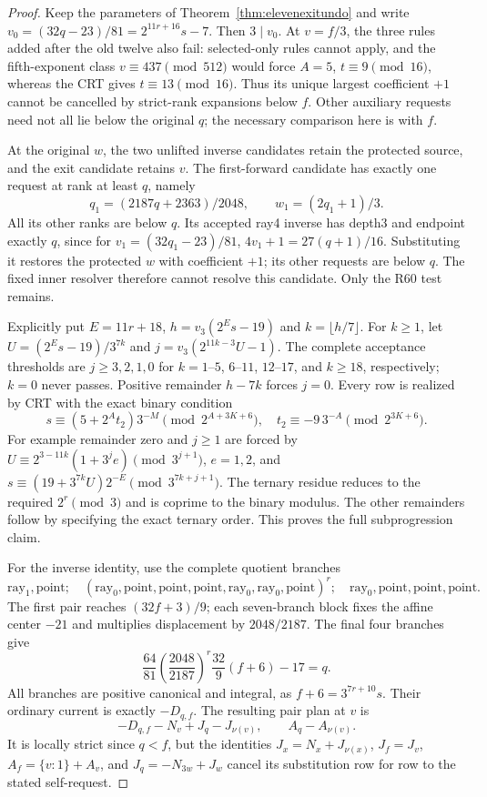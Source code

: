 \documentclass[11pt]{article}
\begin{document}
\begin{proof}
Keep the parameters of Theorem~\ref{thm:elevenexitundo} and write
$v_0=(32q-23)/81=2^{11r+16}s-7$. Then $3\mid v_0$.
At $v=f/3$, the three rules added after the old twelve also fail:
selected-only rules cannot apply, and the fifth-exponent class
$v\equiv437\pmod{512}$ would force $A=5$, $t\equiv9\pmod{16}$,
whereas the CRT gives $t\equiv13\pmod{16}$. Thus its unique largest
coefficient $+1$ cannot be cancelled by strict-rank expansions below $f$.
Other auxiliary requests need not all lie below the original $q$;
the necessary comparison here is with $f$.

At the original $w$, the two unlifted inverse candidates retain the
protected source, and the exit candidate retains $v$. The first-forward
candidate has exactly one request at rank at least $q$, namely
\[
 q_1=(2187q+2363)/2048,\qquad w_1=(2q_1+1)/3.
\]
All its other ranks are below $q$. Its accepted ray4 inverse has
depth3 and endpoint exactly $q$, since for $v_1=(32q_1-23)/81$,
$4v_1+1=27(q+1)/16$. Substituting it restores the protected
$w$ with coefficient $+1$; its other requests are below $q$.
The fixed inner resolver therefore cannot resolve this candidate.
Only the R60 test remains.

Explicitly put $E=11r+18$, $h=v_3(2^Es-19)$ and $k=\lfloor h/7\rfloor$.
For $k\ge1$, let $U=(2^Es-19)/3^{7k}$ and
$j=v_3(2^{11k-3}U-1)$. The complete acceptance thresholds are
$j\ge3,2,1,0$ for $k=1$--$5$, $6$--$11$, $12$--$17$, and
$k\ge18$, respectively; $k=0$ never passes. Positive remainder
$h-7k$ forces $j=0$. Every row is realized by CRT with the exact
binary condition
\[
 s\equiv(5+2^At_2)3^{-M}\pmod{2^{A+3K+6}},\quad
 t_2\equiv-9\,3^{-A}\pmod{2^{3K+6}}.
\]
For example remainder zero and $j\ge1$ are forced by
$U\equiv2^{3-11k}(1+3^je)\pmod{3^{j+1}}$, $e=1,2$,
and $s\equiv(19+3^{7k}U)2^{-E}\pmod{3^{7k+j+1}}$.
The ternary residue reduces to the required $2^r\pmod3$ and is
coprime to the binary modulus. The other remainders follow by specifying
the exact ternary order. This proves the full subprogression claim.

For the inverse identity, use the complete quotient branches
\[
 \mathrm{ray}_1,\mathrm{point};\quad
 (\mathrm{ray}_0,\mathrm{point},\mathrm{point},\mathrm{point},
   \mathrm{ray}_0,\mathrm{ray}_0,\mathrm{point})^r;\quad
 \mathrm{ray}_0,\mathrm{point},\mathrm{point},\mathrm{point}.
\]
The first pair reaches $(32f+3)/9$; each seven-branch block fixes the
affine center $-21$ and multiplies displacement by $2048/2187$.
The final four branches give
\[
 \frac{64}{81}\left(\frac{2048}{2187}\right)^r
 \frac{32}{9}(f+6)-17=q.
\]
All branches are positive canonical and integral, as
$f+6=3^{7r+10}s$. Their ordinary current is exactly $-D_{q,f}$.
The resulting pair plan at $v$ is
\[
 -D_{q,f}-N_v+J_q-J_{\nu(v)},\qquad A_q-A_{\nu(v)}.
\]
It is locally strict since $q<f$, but the identities
$J_x=N_x+J_{\nu(x)}$, $J_f=J_v$,
$A_f=\{v:1\}+A_v$, and $J_q=-N_{3w}+J_w$
cancel its substitution row for row to the stated self-request.
\end{proof}
\end{document}
